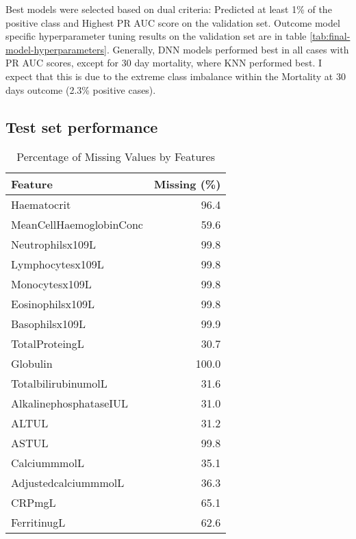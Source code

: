 \documentclass{article}
\begin{document}
Best models were selected based on dual criteria: Predicted at least 1\% of the positive class and Highest PR AUC score on the validation set. Outcome model specific hyperparameter tuning results on the validation set are in table \ref{tab:final-model-hyperparameters}. Generally, DNN models performed best in all cases with PR AUC scores, except for 30 day mortality, where KNN performed best. I expect that this is due to the extreme class imbalance within the Mortality at 30 days outcome (2.3\% positive cases).

\subsection{Test set performance}




\begin{table}[H]
    \centering
    \begin{tabular}{lr}
        \toprule
        \textbf{Feature}        & \textbf{Missing (\%)} \\
        \midrule
        Haematocrit             & 96.4                  \\
        MeanCellHaemoglobinConc & 59.6                  \\
        Neutrophilsx109L        & 99.8                  \\
        Lymphocytesx109L        & 99.8                  \\
        Monocytesx109L          & 99.8                  \\
        Eosinophilsx109L        & 99.8                  \\
        Basophilsx109L          & 99.9                  \\
        TotalProteingL          & 30.7                  \\
        Globulin                & 100.0                 \\
        TotalbilirubinumolL     & 31.6                  \\
        AlkalinephosphataseIUL  & 31.0                  \\
        ALTUL                   & 31.2                  \\
        ASTUL                   & 99.8                  \\
        CalciummmolL            & 35.1                  \\
        AdjustedcalciummmolL    & 36.3                  \\
        CRPmgL                  & 65.1                  \\
        FerritinugL             & 62.6                  \\
        \bottomrule
    \end{tabular}
    \caption{Percentage of Missing Values by Features}
    \label{tab:missing-values}
\end{table}
\end{document}
